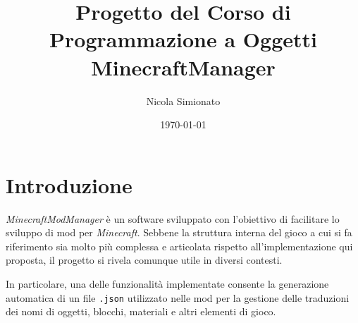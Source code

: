 \documentclass[a4paper,12pt]{article}
\title{\textbf{Progetto del Corso di Programmazione a Oggetti}\\\large MinecraftManager}
\author{Nicola Simionato}
\date{\today}
\begin{document}
\maketitle

\section{Introduzione}

\textit{MinecraftModManager} è un software sviluppato con l'obiettivo di facilitare lo sviluppo di mod per \textit{Minecraft}.  
Sebbene la struttura interna del gioco a cui si fa riferimento sia molto più complessa e articolata rispetto all'implementazione qui proposta, il progetto si rivela comunque utile in diversi contesti.

In particolare, una delle funzionalità implementate consente la generazione automatica di un file \texttt{.json} utilizzato nelle mod per la gestione delle traduzioni dei nomi di oggetti, blocchi, materiali e altri elementi di gioco.
\end{document}
